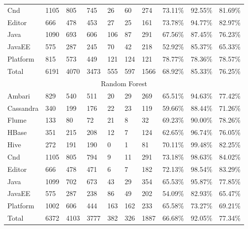 \begin{table}[]
{\begin{tabular}{llllllllll}
Cnd & 1105 & 805 & 745 & 26 & 60 & 274 & 73.11\% & 92.55\% & 81.69\% \\
Editor & 666 & 478 & 453 & 27 & 25 & 161 & 73.78\% & 94.77\% & 82.97\% \\
Java & 1090 & 693 & 606 & 106 & 87 & 291 & 67.56\% & 87.45\% & 76.23\% \\
JavaEE & 575 & 287 & 245 & 70 & 42 & 218 & 52.92\% & 85.37\% & 65.33\% \\
Platform & 815 & 573 & 449 & 121 & 124 & 121 & 78.77\% & 78.36\% & 78.57\% \\
Total & 6191 & 4070 & 3473 & 555 & 597 & 1566 & 68.92\% & 85.33\% & 76.25\% \\ \hline
\multicolumn{10}{c}{Random Forest} \\ \hline
Ambari & 829 & 540 & 511 & 20 & 29 & 269 & 65.51\% & 94.63\% & 77.42\% \\
Cassandra & 340 & 199 & 176 & 22 & 23 & 119 & 59.66\% & 88.44\% & 71.26\% \\
Flume & 133 & 80 & 72 & 21 & 8 & 32 & 69.23\% & 90.00\% & 78.26\% \\
HBase & 351 & 215 & 208 & 12 & 7 & 124 & 62.65\% & 96.74\% & 76.05\% \\
Hive & 272 & 191 & 190 & 0 & 1 & 81 & 70.11\% & 99.48\% & 82.25\% \\
Cnd & 1105 & 805 & 794 & 9 & 11 & 291 & 73.18\% & 98.63\% & 84.02\% \\
Editor & 666 & 478 & 471 & 6 & 7 & 182 & 72.13\% & 98.54\% & 83.29\% \\
Java & 1099 & 702 & 673 & 43 & 29 & 354 & 65.53\% & 95.87\% & 77.85\% \\
JavaEE & 575 & 287 & 238 & 86 & 49 & 202 & 54.09\% & 82.93\% & 65.47\% \\
Platform & 1002 & 606 & 444 & 163 & 162 & 233 & 65.58\% & 73.27\% & 69.21\% \\
Total & 6372 & 4103 & 3777 & 382 & 326 & 1887 & 66.68\% & 92.05\% & 77.34\% \\ \hline
\end{tabular}%
}
\end{table}